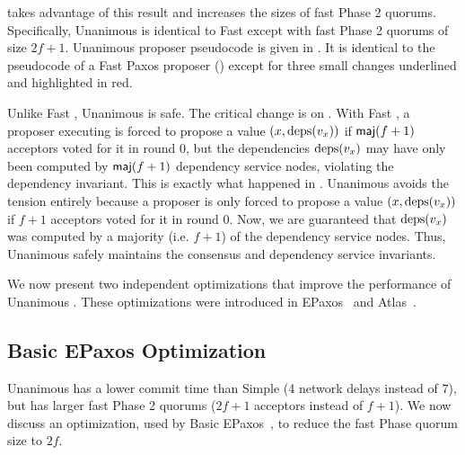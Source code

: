  takes advantage of this result and increases the
sizes of fast Phase 2 quorums. Specifically, Unanimous \BPaxos{} is identical
to Fast \BPaxos{} except with fast Phase 2 quorums of size $2f+1$. Unanimous
\BPaxos{} proposer pseudocode is given in . It
is identical to the pseudocode of a Fast Paxos proposer
() except for three small changes underlined and
highlighted in red.

Unlike Fast \BPaxos{}, Unanimous \BPaxos{} is safe. The critical change is on
. With Fast \BPaxos{}, a proposer executing
 is forced to propose a value $(x, \text{deps}(v_x))$ if
$\textsf{maj}(f+1)$ acceptors voted for it in round $0$, but the dependencies
$\text{deps}(v_x)$ may have only been computed by $\textsf{maj}(f+1)$ dependency service
nodes, violating the dependency invariant. This is exactly what happened in
. Unanimous \BPaxos{} avoids the tension entirely because
a proposer is only forced to propose a value $(x, \text{deps}(v_x))$ if $f+1$
acceptors voted for it in round $0$. Now, we are guaranteed that $\text{deps}(v_x)$
was computed by a majority (i.e. $f+1$) of the dependency service nodes. Thus,
Unanimous \BPaxos{} safely maintains the consensus and dependency service
invariants.

We now present two independent optimizations that improve the performance of
Unanimous \BPaxos{}. These optimizations were introduced in
EPaxos~\cite{moraru2013there} and Atlas~\cite{enes2020state}.

\subsection{Basic EPaxos Optimization}
Unanimous \BPaxos{} has a lower commit time than Simple \BPaxos{} (4 network
delays instead of 7), but has larger fast Phase 2 quorums ($2f+1$ acceptors
instead of $f+1$). We now discuss an optimization, used by Basic
EPaxos~\cite{moraru2013there}, to reduce the fast Phase quorum size to $2f$.

{}

